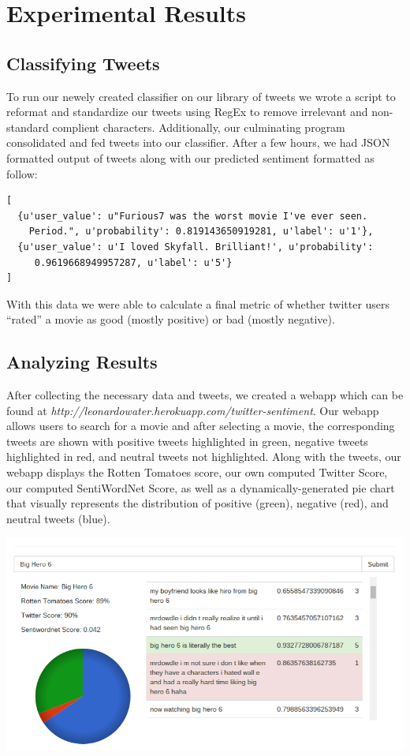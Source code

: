 \documentclass[12pt]{article}
\begin{document}
\section{Experimental Results}\label{S:2}
\subsection{Classifying Tweets}\label{S:3}
To run our newely created classifier on our library of tweets we wrote a script to reformat and standardize our tweets using RegEx to remove irrelevant and non-standard complient characters. Additionally, our culminating program consolidated and fed tweets into our classifier. After a few hours, we had JSON formatted output of tweets along with our predicted sentiment formatted as follow: 
\begin{verbatim}
[
  {u'user_value': u"Furious7 was the worst movie I've ever seen. 
  	Period.", u'probability': 0.819143650919281, u'label': u'1'}, 
  {u'user_value': u'I loved Skyfall. Brilliant!', u'probability':
  	 0.9619668949957287, u'label': u'5'}
]
\end{verbatim}
With this data we were able to calculate a final metric of whether twitter users “rated” a movie as good (mostly positive) or bad (mostly negative).
\subsection{Analyzing Results}\label{S:3}
After collecting the necessary data and tweets, we created a webapp which can be found at {\em http://leonardowater.herokuapp.com/twitter-sentiment}. Our webapp allows users to search for a movie and after selecting a movie, the corresponding tweets are shown with positive tweets highlighted in green, negative tweets highlighted in red, and neutral tweets not highlighted. Along with the tweets, our webapp displays the Rotten Tomatoes score, our own computed Twitter Score, our computed SentiWordNet Score, as well as a dynamically-generated pie chart that visually represents the distribution of positive (green), negative (red), and neutral tweets (blue).

\includegraphics[width=\textwidth]{app}
\end{document}
